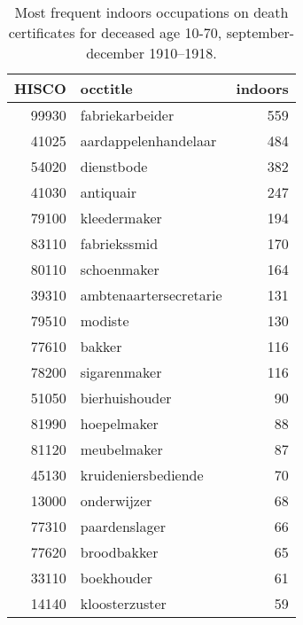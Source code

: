 \begin{table}

\caption{\label{tab:tab:topindoors}Most frequent indoors occupations on death certificates for deceased age 10-70, september-december 1910–1918.}
\centering
\begin{tabular}[t]{r|l|r}
\hline
HISCO & occtitle & indoors\\
\hline
99930 & fabriekarbeider & 559\\
\hline
41025 & aardappelenhandelaar & 484\\
\hline
54020 & dienstbode & 382\\
\hline
41030 & antiquair & 247\\
\hline
79100 & kleedermaker & 194\\
\hline
83110 & fabriekssmid & 170\\
\hline
80110 & schoenmaker & 164\\
\hline
39310 & ambtenaartersecretarie & 131\\
\hline
79510 & modiste & 130\\
\hline
77610 & bakker & 116\\
\hline
78200 & sigarenmaker & 116\\
\hline
51050 & bierhuishouder & 90\\
\hline
81990 & hoepelmaker & 88\\
\hline
81120 & meubelmaker & 87\\
\hline
45130 & kruideniersbediende & 70\\
\hline
13000 & onderwijzer & 68\\
\hline
77310 & paardenslager & 66\\
\hline
77620 & broodbakker & 65\\
\hline
33110 & boekhouder & 61\\
\hline
14140 & kloosterzuster & 59\\
\hline
\end{tabular}
\end{table}
